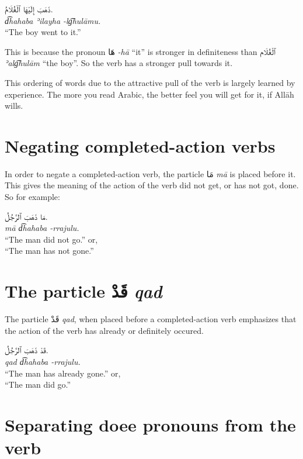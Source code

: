 \documentclass[
  10pt,
]{book}
\begin{document}
\foreignlanguage{arabic}{ذَهَبَ إِلَيْهَا ٱلْغُلَامُ.}\\
\emph{d͡hahaba ʾilayha -lg͡hulāmu.}\\
\enquote{The boy went to it.}

This is because the pronoun \foreignlanguage{arabic}{هَا} \emph{-hā} \enquote{it} is stronger in definiteness than \foreignlanguage{arabic}{ٱلْغُلَام} \emph{ʾalg͡hulām} \enquote{the boy}. So the verb has a stronger pull towards it.

This ordering of words due to the attractive pull of the verb is largely learned by experience. The more you read Arabic, the better feel you will get for it, if Allāh wills.

\section{Negating completed-action verbs}\label{negating-completed-action-verbs}

In order to negate a completed-action verb, the particle \foreignlanguage{arabic}{مَا} \emph{mā} is placed before it. This gives the meaning of the action of the verb did not get, or has not got, done. So for example:

\foreignlanguage{arabic}{مَا ذَهَبَ ٱلرَّجُلُ.}\\
\emph{mā d͡hahaba -rrajulu.}\\
\enquote{The man did not go.} or,\\
\enquote{The man has not gone.}

\section{\texorpdfstring{The particle \foreignlanguage{arabic}{قَدْ} \emph{qad}}{The particle قَدْ qad}}\label{the-particle-ux642ux62f-qad}

The particle \foreignlanguage{arabic}{قَدْ} \emph{qad}, when placed before a completed-action verb emphasizes that the action of the verb has already or definitely occured.

\foreignlanguage{arabic}{قَدْ ذَهَبَ ٱلرَّجُلُ.}\\
\emph{qad d͡hahaba -rrajulu.}\\
\enquote{The man has already gone.} or,\\
\enquote{The man did go.}

\section{Separating doee pronouns from the verb}\label{separating-doee-pronouns-from-the-verb}
\end{document}
